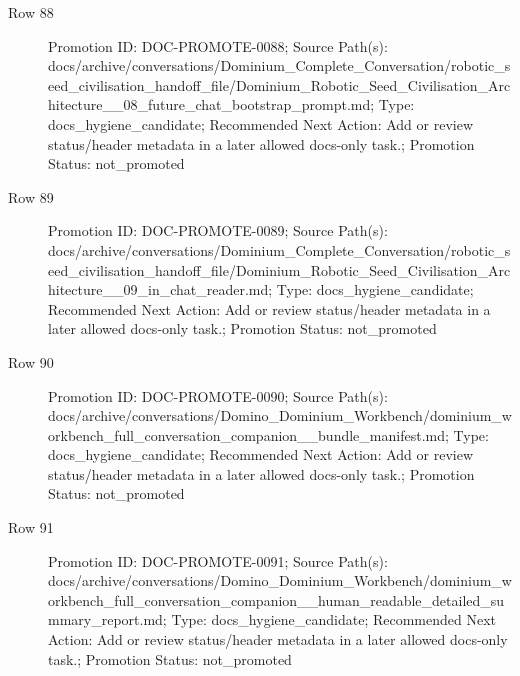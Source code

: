 \documentclass[9pt,a4paper,openany]{book}
\begin{document}
\begin{description}
\item[Row 88] Promotion ID: DOC-\allowbreak{}PROMOTE-\allowbreak{}0088; Source Path(s): docs/\allowbreak{}archive/\allowbreak{}conversations/\allowbreak{}Dominium\_\allowbreak{}Complete\_\allowbreak{}Conversation/\allowbreak{}robotic\_\allowbreak{}seed\_\allowbreak{}civilisation\_\allowbreak{}handoff\_\allowbreak{}file/\allowbreak{}Dominium\_\allowbreak{}Robotic\_\allowbreak{}Seed\_\allowbreak{}Civilisation\_\allowbreak{}Architecture\_\allowbreak{}\_\allowbreak{}08\_\allowbreak{}future\_\allowbreak{}chat\_\allowbreak{}bootstrap\_\allowbreak{}prompt.\allowbreak{}md; Type: docs\_\allowbreak{}hygiene\_\allowbreak{}candidate; Recommended Next Action: Add or review status/\allowbreak{}header metadata in a later allowed docs-\allowbreak{}only task.\allowbreak{}; Promotion Status: not\_\allowbreak{}promoted
\item[Row 89] Promotion ID: DOC-\allowbreak{}PROMOTE-\allowbreak{}0089; Source Path(s): docs/\allowbreak{}archive/\allowbreak{}conversations/\allowbreak{}Dominium\_\allowbreak{}Complete\_\allowbreak{}Conversation/\allowbreak{}robotic\_\allowbreak{}seed\_\allowbreak{}civilisation\_\allowbreak{}handoff\_\allowbreak{}file/\allowbreak{}Dominium\_\allowbreak{}Robotic\_\allowbreak{}Seed\_\allowbreak{}Civilisation\_\allowbreak{}Architecture\_\allowbreak{}\_\allowbreak{}09\_\allowbreak{}in\_\allowbreak{}chat\_\allowbreak{}reader.\allowbreak{}md; Type: docs\_\allowbreak{}hygiene\_\allowbreak{}candidate; Recommended Next Action: Add or review status/\allowbreak{}header metadata in a later allowed docs-\allowbreak{}only task.\allowbreak{}; Promotion Status: not\_\allowbreak{}promoted
\item[Row 90] Promotion ID: DOC-\allowbreak{}PROMOTE-\allowbreak{}0090; Source Path(s): docs/\allowbreak{}archive/\allowbreak{}conversations/\allowbreak{}Domino\_\allowbreak{}Dominium\_\allowbreak{}Workbench/\allowbreak{}dominium\_\allowbreak{}workbench\_\allowbreak{}full\_\allowbreak{}conversation\_\allowbreak{}companion\_\allowbreak{}\_\allowbreak{}bundle\_\allowbreak{}manifest.\allowbreak{}md; Type: docs\_\allowbreak{}hygiene\_\allowbreak{}candidate; Recommended Next Action: Add or review status/\allowbreak{}header metadata in a later allowed docs-\allowbreak{}only task.\allowbreak{}; Promotion Status: not\_\allowbreak{}promoted
\item[Row 91] Promotion ID: DOC-\allowbreak{}PROMOTE-\allowbreak{}0091; Source Path(s): docs/\allowbreak{}archive/\allowbreak{}conversations/\allowbreak{}Domino\_\allowbreak{}Dominium\_\allowbreak{}Workbench/\allowbreak{}dominium\_\allowbreak{}workbench\_\allowbreak{}full\_\allowbreak{}conversation\_\allowbreak{}companion\_\allowbreak{}\_\allowbreak{}human\_\allowbreak{}readable\_\allowbreak{}detailed\_\allowbreak{}summary\_\allowbreak{}report.\allowbreak{}md; Type: docs\_\allowbreak{}hygiene\_\allowbreak{}candidate; Recommended Next Action: Add or review status/\allowbreak{}header metadata in a later allowed docs-\allowbreak{}only task.\allowbreak{}; Promotion Status: not\_\allowbreak{}promoted

\end{description}
\end{document}
